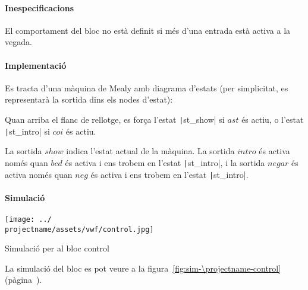 \paragraph{Inespecificacions}


El comportament del bloc no està definit si més d'una entrada està activa a la vegada.


\paragraph{Implementació}




Es tracta d'una màquina de Mealy amb diagrama d'estats (per simplicitat, es
representarà la sortida dins els nodes d'estat):

\begin{center}  \end{center}

Quan arriba el flanc de rellotge, es força l'estat \texttt|st_show| si $ast$ és
actiu, o l'estat \texttt|st_intro| si $coi$ és actiu.

La sortida $show$ indica l'estat actual de la màquina. La sortida $intro$ és activa
només quan $bcd$ és activa i ens trobem en l'estat \texttt|st_intro|, i la
sortida $negar$ és activa només quan $neg$ és activa i ens trobem en l'estat \texttt|st_intro|.

\paragraph{Simulació}

\begin{contendfig}
  \begin{center}
    \texttt{[image: ../\\projectname/assets/vwf/control.jpg]}
  \end{center}
  \caption{\label{fig:sim-\projectname-control} Simulació per al bloc \textsf{control}}
\end{contendfig}

La simulació del bloc es pot veure a la figura~\ref{fig:sim-\projectname-control} (pàgina~\pageref{fig:sim-\projectname-control}).


\vspace{1cm}
